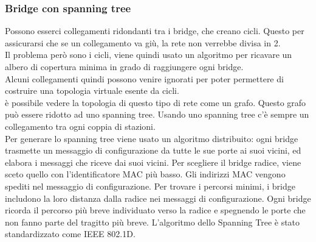 \documentclass{article}
\begin{document}
{\begin{enumerate}
\subsubsection{Bridge con spanning tree}
Possono esserci collegamenti ridondanti tra i bridge, che creano cicli. Questo per assicurarsi che se un collegamento va giù, la rete non verrebbe divisa in 2. \\
Il problema però sono i cicli, viene quindi usato un algoritmo per ricavare un albero di copertura minima in grado di raggiungere ogni bridge.\\
Alcuni collegamenti quindi possono venire ignorati per poter permettere di costruire una topologia virtuale esente da cicli.\\
è possibile vedere la topologia di questo tipo di rete come un grafo. Questo grafo può essere ridotto ad uno spanning tree. Usando uno spanning tree c'è sempre un collegamento tra ogni coppia di stazioni.\\
Per generare lo spanning tree viene usato un algoritmo distribuito: ogni bridge trasmette un messaggio di configurazione da tutte le sue porte ai suoi vicini, ed elabora i messaggi che riceve dai suoi vicini.
Per scegliere il bridge radice, viene sceto quello con l'identificatore MAC più basso. Gli indirizzi MAC vengono spediti nel messaggio di configurazione. 
Per trovare i percorsi minimi, i bridge includono la loro distanza dalla radice nei messaggi di configurazione. Ogni bridge ricorda il percorso più breve individuato verso la radice e spegnendo le porte che non fanno parte del tragitto più breve.
L'algoritmo dello Spanning Tree è stato standardizzato come IEEE 802.1D.


\end{enumerate}}
\end{document}

